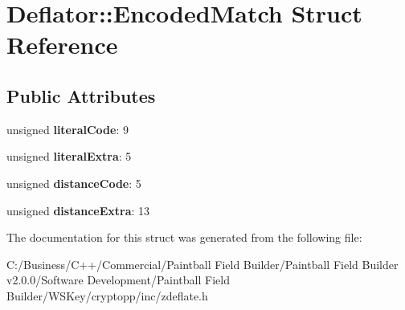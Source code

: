 \hypertarget{struct_deflator_1_1_encoded_match}{
\section{Deflator::EncodedMatch Struct Reference}
\label{struct_deflator_1_1_encoded_match}
}
\subsection*{Public Attributes}
\begin{DoxyCompactItemize}
\item 
\hypertarget{struct_deflator_1_1_encoded_match_af165e9e4f7e6c5d2bc8017632a1827b6}{
unsigned {\bfseries literalCode}: 9}
\label{struct_deflator_1_1_encoded_match_af165e9e4f7e6c5d2bc8017632a1827b6}

\item 
\hypertarget{struct_deflator_1_1_encoded_match_aac1d1b47dcc7ee6d977f27bd11d45c71}{
unsigned {\bfseries literalExtra}: 5}
\label{struct_deflator_1_1_encoded_match_aac1d1b47dcc7ee6d977f27bd11d45c71}

\item 
\hypertarget{struct_deflator_1_1_encoded_match_aa57b98490bbb141b30670040e79ad42d}{
unsigned {\bfseries distanceCode}: 5}
\label{struct_deflator_1_1_encoded_match_aa57b98490bbb141b30670040e79ad42d}

\item 
\hypertarget{struct_deflator_1_1_encoded_match_a1b1c4075cefdd9cb79bd85ac7dc63aa9}{
unsigned {\bfseries distanceExtra}: 13}
\label{struct_deflator_1_1_encoded_match_a1b1c4075cefdd9cb79bd85ac7dc63aa9}

\end{DoxyCompactItemize}


The documentation for this struct was generated from the following file:\begin{DoxyCompactItemize}
\item 
C:/Business/C++/Commercial/Paintball Field Builder/Paintball Field Builder v2.0.0/Software Development/Paintball Field Builder/WSKey/cryptopp/inc/zdeflate.h\end{DoxyCompactItemize}
